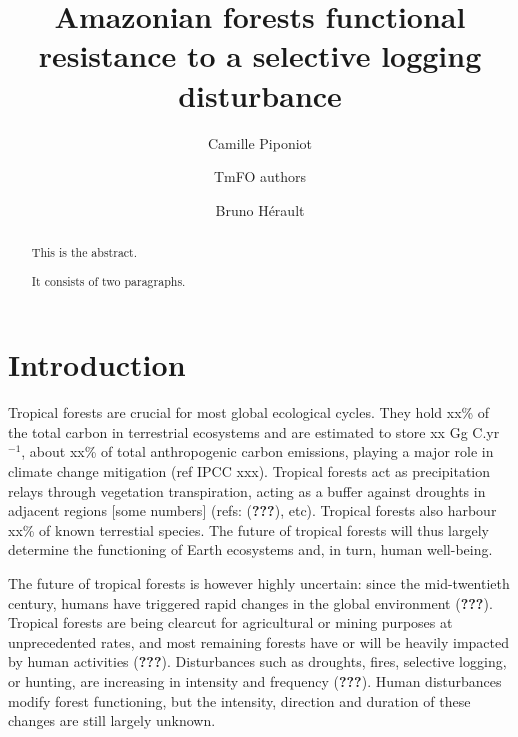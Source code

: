 \documentclass[]{elsarticle} %
\begin{document}
\begin{frontmatter}

  \title{Amazonian forests functional resistance to a selective logging
disturbance}
    \author[1]{Camille Piponiot}
    \author[]{TmFO authors}
  
  
    \author[1, 2]{Bruno Hérault}
  
      \address[1]{Cirad, UR Forets et Societes, Montferrier-sur-Lez, France}
    \address[2]{INPHB, Yamoussoukro, Cote d'Ivoire}
  
  \begin{abstract}
  This is the abstract.
  
  It consists of two paragraphs.
  \end{abstract}
  
 \end{frontmatter}

\section{Introduction}\label{introduction}

Tropical forests are crucial for most global ecological cycles. They
hold xx\% of the total carbon in terrestrial ecosystems and are
estimated to store xx Gg C.yr\(^{-1}\), about xx\% of total
anthropogenic carbon emissions, playing a major role in climate change
mitigation (ref IPCC xxx). Tropical forests act as precipitation relays
through vegetation transpiration, acting as a buffer against droughts in
adjacent regions {[}some numbers{]} (refs: ({\textbf{???}}), etc).
Tropical forests also harbour xx\% of known terrestial species. The
future of tropical forests will thus largely determine the functioning
of Earth ecosystems and, in turn, human well-being.

The future of tropical forests is however highly uncertain: since the
mid-twentieth century, humans have triggered rapid changes in the global
environment ({\textbf{???}}). Tropical forests are being clearcut for
agricultural or mining purposes at unprecedented rates, and most
remaining forests have or will be heavily impacted by human activities
({\textbf{???}}). Disturbances such as droughts, fires, selective
logging, or hunting, are increasing in intensity and frequency
({\textbf{???}}). Human disturbances modify forest functioning, but the
intensity, direction and duration of these changes are still largely
unknown.
\end{document}
